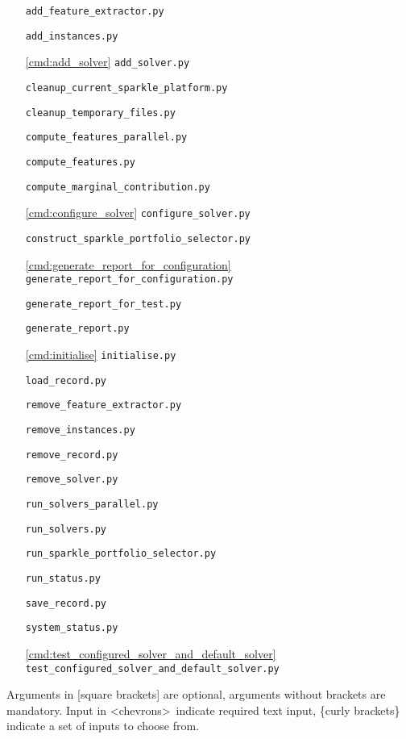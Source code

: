 \documentclass{article}
\begin{document}
\begin{itemize}[noitemsep]
  \item[] \texttt{add\_feature\_extractor.py}
  \item[] \texttt{add\_instances.py}
  \item[\ref{cmd:add_solver}] \texttt{add\_solver.py}
  \item[] \texttt{cleanup\_current\_sparkle\_platform.py}
  \item[] \texttt{cleanup\_temporary\_files.py}
  \item[] \texttt{compute\_features\_parallel.py}
  \item[] \texttt{compute\_features.py}
  \item[] \texttt{compute\_marginal\_contribution.py}
  \item[\ref{cmd:configure_solver}] \texttt{configure\_solver.py}
  \item[] \texttt{construct\_sparkle\_portfolio\_selector.py}
  \item[\ref{cmd:generate_report_for_configuration}] \texttt{generate\_report\_for\_configuration.py}
  \item[] \texttt{generate\_report\_for\_test.py}
  \item[] \texttt{generate\_report.py}
  \item[\ref{cmd:initialise}] \texttt{initialise.py}
  \item[] \texttt{load\_record.py}
  \item[] \texttt{remove\_feature\_extractor.py}
  \item[] \texttt{remove\_instances.py}
  \item[] \texttt{remove\_record.py}
  \item[] \texttt{remove\_solver.py}
  \item[] \texttt{run\_solvers\_parallel.py}
  \item[] \texttt{run\_solvers.py}
  \item[] \texttt{run\_sparkle\_portfolio\_selector.py}
  \item[] \texttt{run\_status.py}
  \item[] \texttt{save\_record.py}
  \item[] \texttt{system\_status.py}
  \item[\ref{cmd:test_configured_solver_and_default_solver}] \texttt{test\_configured\_solver\_and\_default\_solver.py}
\end{itemize}

Arguments in [square brackets] are optional, arguments without brackets are mandatory. Input in \textless chevrons\textgreater~indicate required text input, \{curly brackets\} indicate a set of inputs to choose from.
\end{document}
